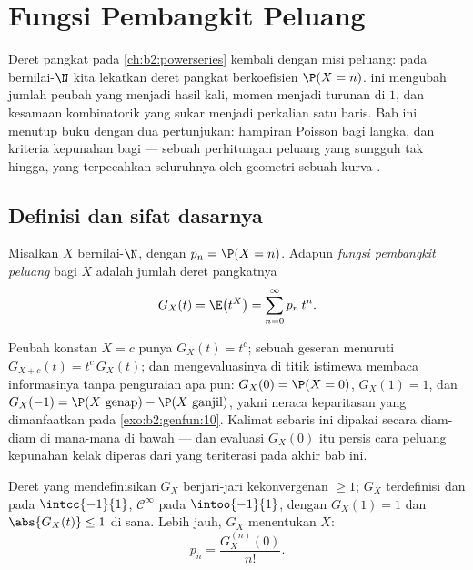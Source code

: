 \chapter{Fungsi Pembangkit Peluang}\label{ch:b2:genfun}

Deret pangkat pada \cref{ch:b2:powerseries} kembali dengan misi
peluang: pada  bernilai-$\N$ kita lekatkan
deret pangkat berkoefisien $\P(X = n)$. \emph{} ini mengubah jumlah peubah yang 
menjadi hasil kali, momen menjadi turunan di $1$, dan kesamaan
kombinatorik yang sukar menjadi perkalian satu baris. Bab
ini menutup buku dengan dua pertunjukan: hampiran Poisson
bagi  langka, dan kriteria kepunahan bagi
 --- sebuah perhitungan peluang yang
sungguh tak hingga, yang terpecahkan seluruhnya oleh
geometri sebuah kurva .

\section{Definisi dan sifat dasarnya}

\begin{definition}\label{def:b2:genfun:pgf}
Misalkan $X$  bernilai-$\N$, dengan $p_n = \P(X = n)$. Adapun
\emph{fungsi pembangkit peluang} bagi $X$ adalah jumlah
deret pangkatnya
\[
G_X(t) = \E\bigl(t^X\bigr) = \sum_{n=0}^{\infty} p_n\,t^n .
\]
\end{definition}

\begin{example}\label{ex:b2:genfun:firstreflexes}
Peubah konstan $X = c$ punya $G_X(t) = t^c$; sebuah geseran menuruti
$G_{X+c}(t) = t^c\,G_X(t)$; dan mengevaluasinya di titik istimewa
membaca informasinya tanpa penguraian apa pun: $G_X(0) = \P(X
= 0)$, $G_X(1) = 1$, dan $G_X(-1) = \P(X\text{ genap}) -
\P(X\text{ ganjil})$, yakni neraca keparitasan yang dimanfaatkan pada
\cref{exo:b2:genfun:10}. Kalimat sebaris ini dipakai secara diam-diam
di mana-mana di bawah --- dan evaluasi $G_X(0)$ itu persis
cara peluang kepunahan kelak diperas dari  yang teriterasi pada akhir bab ini.
\end{example}

\begin{proposition}\label{prop:b2:genfun:radius}
Deret yang mendefinisikan $G_X$ berjari-jari kekonvergenan $\geq 1$;
$G_X$ terdefinisi dan  pada $\intcc{-1}{1}$,
$\mathcal{C}^\infty$ pada $\intoo{-1}{1}$, dengan $G_X(1) = 1$ dan
$\abs{G_X(t)} \leq 1$ di sana. Lebih jauh, $G_X$ menentukan 
$X$:
\[
p_n = \frac{G_X^{(n)}(0)}{n!} .
\]
\end{proposition}

